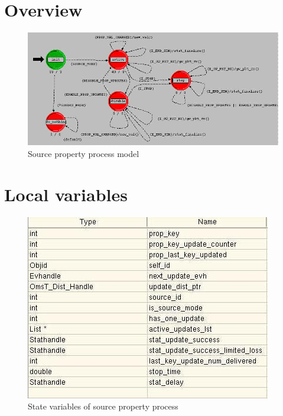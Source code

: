 

\section{Overview}
\begin{figure}[ht]
    \centering
    \includegraphics[scale=0.6]{images/p_source_property}
    \caption{Source property process model}
    \label{fig:appendix-a}
\end{figure}

\newpage

\section{Local variables}
\begin{figure}[ht]
    \centering
    \includegraphics[width=.7\textwidth]{images/state_variable_source_property}
    \caption{State variables of source property process}
    \label{fig:appendix-a_sv}
\end{figure}

